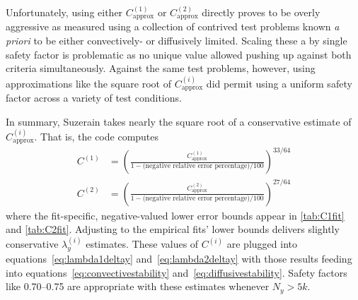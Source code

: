 \documentclass[letterpaper,11pt,nointlimits,reqno,draft]{amsbook}
\begin{document}
Unfortunately, using either $C_\text{approx}^{(1)}$ or $C_\text{approx}^{(2)}$
directly proves to be overly aggressive as measured using a collection of
contrived test problems known \emph{a priori} to be either convectively- or
diffusively limited.  Scaling these a by single safety factor is problematic as no
unique value allowed pushing up against both criteria simultaneously.  Against
the same test problems, however, using approximations like the square root of
$C_\text{approx}^{(i)}$ did permit using a uniform safety factor across a
variety of test conditions.

In summary, Suzerain takes nearly the square root of a conservative estimate of
$C_\text{approx}^{(i)}$.  That is, the code computes
\begin{align}
  C^{(1)} &= \left(
      \frac{C_\text{approx}^{(1)}}
           {1 - \text{(negative relative error percentage)}/100}
  \right)^{33/64}
\\
  C^{(2)} &= \left(
      \frac{C_\text{approx}^{(2)}}
           {1 - \text{(negative relative error percentage)}/100}
  \right)^{27/64}
\end{align}
where the fit-specific, negative-valued lower error bounds appear in
\autoref{tab:C1fit} and \autoref{tab:C2fit}.  Adjusting to the empirical fits'
lower bounds delivers slightly conservative $\lambda_y^{(i)}$ estimates.  These
values of $C^{(i)}$ are plugged into equations~\eqref{eq:lambda1deltay}
and~\eqref{eq:lambda2deltay} with those results feeding into
equations~\eqref{eq:convectivestability} and~\eqref{eq:diffusivestability}.
Safety factors like 0.70--0.75 are appropriate with these estimates whenever
$N_y > 5k$.
\end{document}

